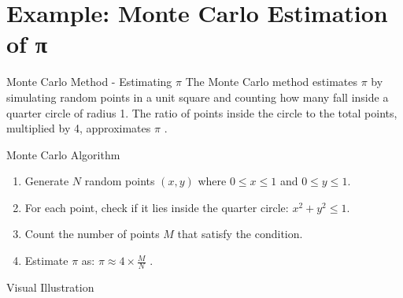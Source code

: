 \section[Example: Monte Carlo Estimation of pi]{Example: Monte Carlo Estimation of π}
\begin{frame}{Monte Carlo Method - Estimating $\pi$}
  The Monte Carlo method \parencite{Metropolis01091949} estimates $\pi$ by simulating random points in a unit square and counting how many fall inside a quarter circle of radius 1. The ratio of points inside the circle to the total points, multiplied by 4, approximates $\pi$ \parencite{beckmann1971history}.
\end{frame}



\begin{frame}{Monte Carlo Algorithm}
  \begin{enumerate}
    \item Generate $N$ random points $(x, y)$ where $0 \leq x \leq 1$ and $0 \leq y \leq 1$.
    \item For each point, check if it lies inside the quarter circle: $x^2 + y^2 \leq 1$.
    \item Count the number of points $M$ that satisfy the condition.
    \item Estimate $\pi$ as: $\pi \approx 4 \times \frac{M}{N}$ \parencite{hammersley1964monte}.
  \end{enumerate}
\end{frame}

\begin{frame}{Visual Illustration}
  \begin{center}
  \end{center}
\end{frame}


